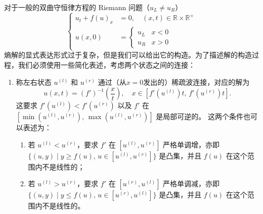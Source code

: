 对于一般的双曲守恒律方程的 Riemann 问题（$u_L \neq u_R$）
\[
    \left\{
    \begin{aligned}
        u_t + f(u)_x & = 0,\quad (x,t) \in \mathbb{R} \times  \mathbb{R}^+ \\
        u(x,0)       & =
        \begin{cases}
            u_L & x < 0 \\
            u_R & x > 0
        \end{cases}
    \end{aligned}
    \right.
\]
熵解的显式表达形式过于复杂，但是我们可以给出它的构造。为了描述解的构造过程，我们必须使用一些简化表述，考虑两个状态之间的连接：
\begin{enumerate}
    \item 称左右状态 $u^{(l)}$ 和 $u^{(r)}$ 通过（从$x=0$发出的）稀疏波连接，对应的解为
          \[
              u(x,t) = (f')^{-1}\left(\frac{x}{t}\right), \quad  x \in [f'(u^{(l)}) t ,\, f'(u^{(r)}) t ].
          \]
          这要求 $f'(u^{(l)}) < f'(u^{(r)})$ 以及 $f'$ 在 $[\min(u^{(l)},u^{(r)}),\,\max(u^{(l)},u^{(r)})]$ 是局部可逆的。
          这两个条件也可以表述为：

          \begin{enumerate}
              \item 若 $u^{(l)} < u^{(r)}$，要求 $f'$ 在 $[u^{(l)},u^{(r)}]$ 严格单调增，亦即 $\{ (u,y) \mid y \ge f(u),\, u \in [u^{(l)},u^{(r)}]\}$ 是凸集，并且 $f(u)$ 在这个范围内不是线性的；
              \item 若 $u^{(l)} > u^{(r)}$，要求 $f'$ 在 $[u^{(r)},u^{(l)}]$ 严格单调减，亦即 $\{ (u,y) \mid y \le f(u),\, u \in [u^{(r)},u^{(l)}]\}$ 是凸集，并且 $f(u)$ 在这个范围内不是线性的。
          \end{enumerate}


\end{enumerate}
